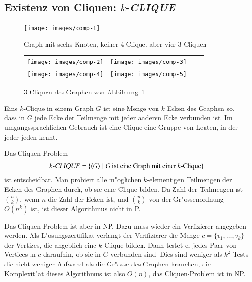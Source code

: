 \subsection{Existenz von Cliquen: $k$-\textsl{CLIQUE}}
\begin{figure}
\begin{center}
\texttt{[image: images/comp-1]}
\end{center}
\caption{Graph mit sechs Knoten, keiner 4-Clique, aber
vier 3-Cliquen\label{6graph}}
\end{figure}%
\begin{figure}
\begin{center}
\begin{tabular}{cccc}
\texttt{[image: images/comp-2]}&%
\texttt{[image: images/comp-3]}\\
\texttt{[image: images/comp-4]}&%
\texttt{[image: images/comp-5]}
\end{tabular}
\end{center}
\caption{3-Cliquen des Graphen von Abbildung~\ref{6graph}}
\end{figure}%
Eine $k$-Clique in einem Graph $G$ ist eine Menge von $k$
Ecken des Graphen so, dass in $G$ jede Ecke der Teilmenge mit
jeder anderen Ecke verbunden ist. Im umgangssprachlichen Gebrauch
ist eine Clique eine Gruppe von Leuten, in der jeder jeden kennt.

Das Cliquen-Problem
\[
\text{$k$-\textsl{CLIQUE}} = \{ \langle G\rangle\;|\;
\text{$G$ ist eine Graph mit einer $k$-Clique}\}
\]
ist entscheidbar. Man probiert alle m"oglichen $k$-elementigen
Teilmengen der Ecken des Graphen durch, ob sie eine Clique
bilden. Da Zahl der Teilmengen ist $\binom{n}{k}$, wenn $n$
die Zahl der Ecken ist, und $\binom{n}{k}$ von der Gr"ossenordnung
$O(n^k)$ ist, ist dieser Algorithmus nicht in P.

Das Cliquen-Problem ist aber in NP. Dazu muss wieder ein
Verfizierer angegeben werden. Als L"osungszertifikat verlangt
der Verifizierer die Menge $c=\{v_1,\dots,v_k\}$ der
Vertizes, die angeblich eine $k$-Clique bilden. Dann testet
er jedes Paar von Vertices in $c$ daraufhin, ob sie in $G$
verbunden sind. Dies sind weniger als $k^2$ Tests die nicht
weniger Aufwand als die Gr"osse des Graphen brauchen, die
Komplexit"at dieses Algorithmus ist also $O(n)$, das
Cliquen-Problem ist in NP.

